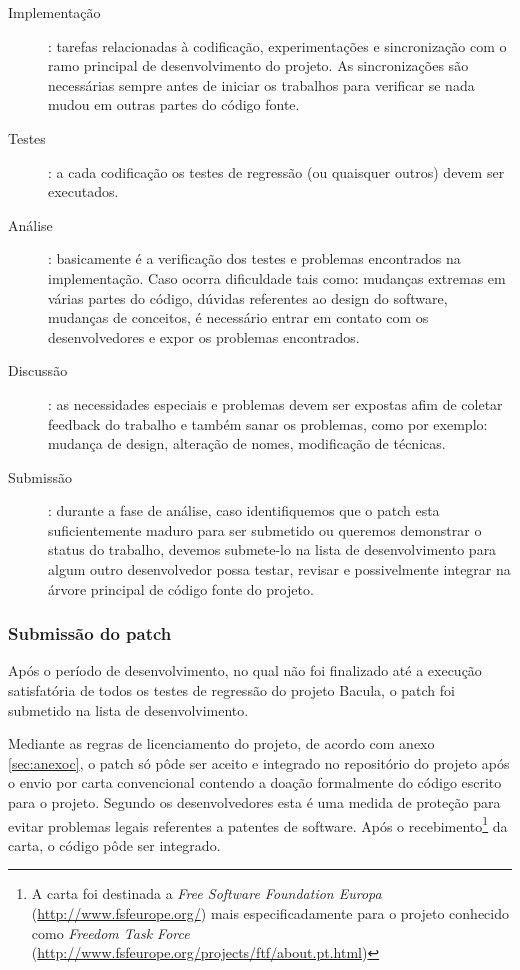 \begin{description}
\item[Implementação]: tarefas relacionadas à codificação, experimentações e sincronização com o ramo principal de desenvolvimento do projeto. As sincronizações são necessárias sempre antes de iniciar os trabalhos para verificar se nada mudou em outras partes do código fonte.
\item[Testes]: a cada codificação os testes de regressão (ou quaisquer outros) devem ser executados.
\item[Análise]: basicamente é a verificação dos testes e problemas encontrados na implementação. Caso ocorra dificuldade tais como: mudanças extremas em várias partes do código, dúvidas referentes ao design do software, mudanças de conceitos, é necessário entrar em contato com os desenvolvedores e expor os problemas encontrados.
\item[Discussão]: as necessidades especiais e problemas devem ser expostas afim de coletar feedback do trabalho e também sanar os problemas, como por exemplo: mudança de design, alteração de nomes, modificação de técnicas.
\item[Submissão]: durante a fase de análise, caso identifiquemos que o patch esta suficientemente maduro para ser submetido ou queremos demonstrar o status do trabalho, devemos submete-lo na lista de desenvolvimento para algum outro desenvolvedor possa testar, revisar e possivelmente integrar na árvore principal de código fonte do projeto.
\end{description}

\subsubsection{Submissão do patch}

Após o período de desenvolvimento, no qual não foi finalizado até a execução satisfatória de todos os testes de regressão do projeto Bacula, o patch \patchshort foi submetido na lista de desenvolvimento. 

Mediante as regras de licenciamento do projeto, de acordo com anexo \ref{sec:anexoc}, o patch só pôde ser aceito e integrado no repositório do projeto após o envio por carta convencional contendo a doação formalmente do código escrito para o projeto. Segundo os desenvolvedores esta é uma medida de proteção para evitar problemas legais referentes a patentes de software. 
Após o recebimento\footnote{A carta foi destinada a \textit{Free Software Foundation Europa} (\url{http://www.fsfeurope.org/}) mais especificadamente para o projeto conhecido como \textit{Freedom Task Force} (\url{http://www.fsfeurope.org/projects/ftf/about.pt.html})} da carta, o código pôde ser integrado.

